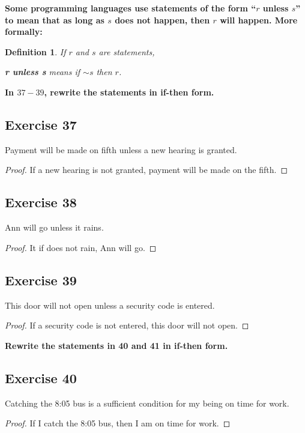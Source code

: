 \documentclass[14pt]{extarticle}
\newtheorem{defn}{Definition} \newtheorem{thm}{Theorem}
\begin{document}
{\bf Some programming languages use statements of the form “$r$ unless $s$” to
mean that as long as $s$ does not happen, then $r$ will happen. More formally:}

\begin{tcolorbox}[colframe=cyan,colback=white] \begin{defn} If $r$ and $s$ are
statements, \begin{center} {\bf r unless s} means if ${\sim s}$ then $r$.
\end{center} \end{defn} \end{tcolorbox}

{\bf In $37-39$, rewrite the statements in if-then form.}

\subsection{Exercise 37} Payment will be made on fifth unless a new hearing is
granted.

\begin{proof} If a new hearing is not granted, payment will be made on the
fifth. \end{proof}

\subsection{Exercise 38} Ann will go unless it rains.
\begin{proof} It if does not rain, Ann will go. \end{proof}
\subsection{Exercise 39} This door will not open unless a security code is
entered.

\begin{proof} If a security code is not entered, this door will not open.
\end{proof}

{\bf Rewrite the statements in 40 and 41 in if-then form.}

\subsection{Exercise 40} Catching the 8:05 bus is a sufficient condition for my
being on time for work.

\begin{proof} If I catch the 8:05 bus, then I am on time for work. \end{proof}
\end{document}
